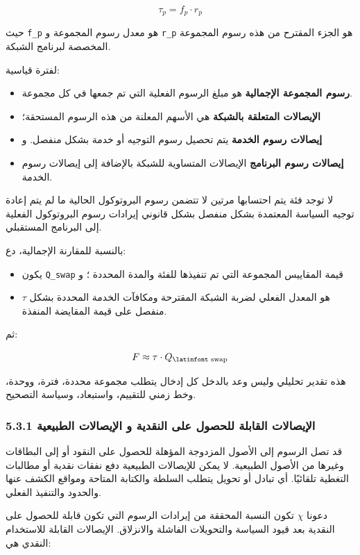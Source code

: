 \documentclass[11pt]{article}
\begin{document}
\[
\tau_p = f_p \cdot r_p
\]

حيث \texttt{f\_p} هو معدل رسوم المجموعة و \texttt{r\_p} هو الجزء المقترح من هذه رسوم المجموعة المخصصة لبرنامج الشبكة.

لفترة قياسية:

\begin{itemize}[leftmargin=*]
\item \textbf{رسوم المجموعة الإجمالية} هو مبلغ الرسوم الفعلية التي تم جمعها في كل مجموعة.
\item \textbf{الإيصالات المتعلقة بالشبكة} هي الأسهم المعلنة من هذه الرسوم المستحقة؛
\item \textbf{إيصالات رسوم الخدمة} يتم تحصيل رسوم التوجيه أو خدمة بشكل منفصل. و
\item \textbf{إيصالات رسوم البرنامج} الإيصالات المتساوية للشبكة بالإضافة إلى إيصالات رسوم الخدمة.
\end{itemize}
لا توجد فئة يتم احتسابها مرتين لا تتضمن رسوم البروتوكول الحالية ما لم يتم إعادة توجيه السياسة المعتمدة بشكل منفصل بشكل قانوني إيرادات رسوم البروتوكول الفعلية إلى البرنامج المستقبلي.

بالنسبة للمقارنة الإجمالية، دع:

\begin{itemize}[leftmargin=*]
\item يكون \texttt{Q\_swap} قيمة المقاييس المجموعة التي تم تنفيذها للفئة والمدة المحددة ؛ و
\item \texttt{$\tau$} هو المعدل الفعلي لضربة الشبكة المقترحة ومكافآت الخدمة المحددة بشكل منفصل على قيمة المقايضة المنفذة.
\end{itemize}
ثم:

\[
F \approx \tau \cdot Q_{\text{\latinfont swap}}
\]

هذه تقدير تحليلي وليس وعد بالدخل كل إدخال يتطلب مجموعة محددة، فترة، ووحدة، وخط زمني للتقييم، واستبعاد، وسياسة التصحيح.

\subsubsection*{5.3.1 الإيصالات القابلة للحصول على النقدية و الإيصالات الطبيعية}

قد تصل الرسوم إلى الأصول المزدوجة المؤهلة للحصول على النقود أو إلى البطاقات وغيرها من الأصول الطبيعية. لا يمكن للإيصالات الطبيعية دفع نفقات نقدية أو مطالبات التغطية تلقائيًا. أي تبادل أو تحويل يتطلب السلطة والكتابة المتاحة ومواقع الكشف عنها والحدود والتنفيذ الفعلي.

دعونا \texttt{$\chi$} تكون النسبة المحققة من إيرادات الرسوم التي تكون قابلة للحصول على النقدية بعد قيود السياسة والتحويلات الفاشلة والانزلاق. الإيصالات القابلة للاستخدام النقدي هي:
\end{document}

